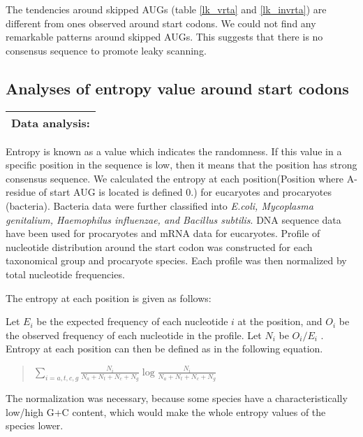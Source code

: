 The tendencies around skipped AUGs (table \ref{lk_vrta} and
\ref{lk_invrta}) are different from ones
observed around start codons. We could not find any remarkable
patterns around skipped AUGs. This suggests that there is no consensus 
sequence to promote leaky scanning.

\subsection{Analyses of entropy value around start codons}

\vspace{2ex}
\noindent
\begin{tabular}{|l|}
\hline
Data analysis:\\
\hline
\end{tabular}

Entropy is known as a value which indicates the randomness.
If this value in a specific position in the sequence is low, then it 
means that the position has strong consensus sequence.
We calculated the entropy at each position(Position where A-residue of 
start AUG is located is defined 0.) for eucaryotes
and procaryotes (bacteria).
Bacteria data were further classified into {\it E.coli, Mycoplasma genitalium,
Haemophilus influenzae, and Bacillus subtilis}.  DNA sequence data have
been used for procaryotes and mRNA data for eucaryotes.  
Profile of nucleotide distribution around the start codon 
was constructed for each taxonomical group and procaryote species.
Each profile was then
normalized by total nucleotide frequencies.

The entropy at each position is given as follows:

\vspace{2ex}
\noindent
Let \( E_{i} \) be  the expected frequency of each
nucleotide \(i\) at the position, and
 \(O_{i} \) be the  observed frequency of each 
nucleotide in the profile. 
Let \( N_{i}\) be \(O_{i} / E_{i} \) .
Entropy at each position can then be defined as in the following equation.
\begin{quotation}
\noindent
\( \sum_{i = a,t,c,g} \frac{N_{i}}{N_{a} + N_{t} 
+ N_{c} + N_{g}} \log{ \frac{N_{i}} {N_{a} + N_{t} + N_{c} + N_{g}} }
\)  \\
\end{quotation}

The normalization was necessary,
because some species  have
a characteristically low/high G+C content, which would make the whole
entropy values of the species lower.


